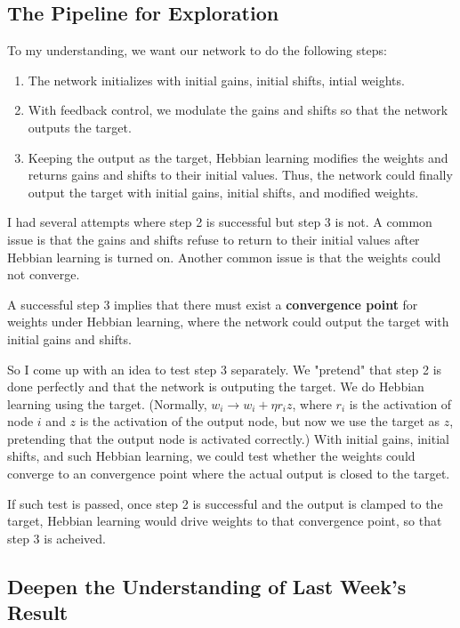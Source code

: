 \documentclass[12pt, a4paper]{article}
\begin{document}
\newpage

\subsection*{The Pipeline for Exploration}

To my understanding, we want our network to do the following steps:

\begin{enumerate}
    \item The network initializes with initial gains, initial shifts, intial weights.
    \item With feedback control, we modulate the gains and shifts so that the network outputs the target.
    \item Keeping the output as the target, Hebbian learning modifies the weights and returns gains and shifts to their initial values. Thus, the network could finally output the target with initial gains, initial shifts, and modified weights. 
\end{enumerate}

I had several attempts where step 2 is successful but step 3 is not. A common issue is that the gains and shifts refuse to return to their initial values after Hebbian learning is turned on. Another common issue is that the weights could not converge.

A successful step 3 implies that there must exist a \textbf{convergence point} for weights under Hebbian learning, where the network could output the target with initial gains and shifts.

So I come up with an idea to test step 3 separately. We "pretend" that step 2 is done perfectly and that the network is outputing the target. We do Hebbian learning using the target. (Normally, $w_{i} \rightarrow w_{i} + \eta r_i z$, where $r_i$ is the activation of node $i$ and $z$ is the activation of the output node, but now we use the target as $z$, pretending that the output node is activated correctly.) With initial gains, initial shifts, and such Hebbian learning, we could test whether the weights could converge to an convergence point where the actual output is closed to the target.

If such test is passed, once step 2 is successful and the output is clamped to the target, Hebbian learning would drive weights to that convergence point, so that step 3 is acheived.

\newpage

\subsection*{Deepen the Understanding of Last Week's Result}
\end{document}
